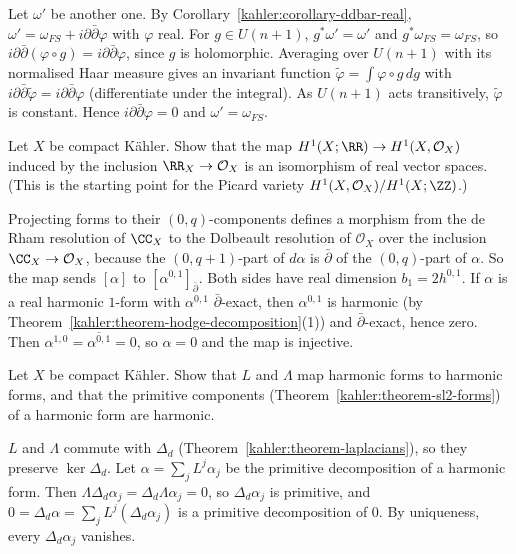 \begin{solution}
Let $\omega'$ be another one. By Corollary~\ref{kahler:corollary-ddbar-real}, $\omega' = \omega_{FS} + i\partial\bar\partial\varphi$
with $\varphi$ real. For $g \in U(n+1)$, $g^*\omega' = \omega'$ and $g^*\omega_{FS} = \omega_{FS}$, so $i\partial\bar\partial(\varphi \circ g) = i\partial\bar\partial\varphi$,
since $g$ is holomorphic. Averaging over $U(n+1)$ with its normalised Haar measure gives an invariant function
$\tilde\varphi = \int\varphi \circ g\,dg$ with $i\partial\bar\partial\tilde\varphi = i\partial\bar\partial\varphi$ (differentiate under the integral). As
$U(n+1)$ acts transitively, $\tilde\varphi$ is constant. Hence $i\partial\bar\partial\varphi = 0$ and $\omega' = \omega_{FS}$.
\end{solution}

\begin{exercise}\label{kahler:exercise-h1-real}
Let $X$ be compact K\"ahler. Show that the map $H^1(X; \RR) \to H^1(X, \mathcal{O}_X)$ induced by the inclusion $\RR_X \to \mathcal{O}_X$ is an
isomorphism of real vector spaces. (This is the starting point for the Picard variety $H^1(X, \mathcal{O}_X)/H^1(X; \ZZ)$.)
\end{exercise}

\begin{solution}
Projecting forms to their $(0,q)$-components defines a morphism from the de Rham resolution of $\CC_X$ to the Dolbeault resolution of
$\mathcal{O}_X$ over the inclusion $\CC_X \to \mathcal{O}_X$, because the $(0, q+1)$-part of $d\alpha$ is $\bar\partial$ of the
$(0,q)$-part of $\alpha$. So the map sends $[\alpha]$ to $[\alpha^{0,1}]_{\bar\partial}$. Both sides have real dimension $b_1 = 2h^{0,1}$.
If $\alpha$ is a real harmonic $1$-form with $\alpha^{0,1}$ $\bar\partial$-exact, then $\alpha^{0,1}$ is harmonic (by
Theorem~\ref{kahler:theorem-hodge-decomposition}(1)) and $\bar\partial$-exact, hence zero. Then $\alpha^{1,0} = \overline{\alpha^{0,1}} = 0$,
so $\alpha = 0$ and the map is injective.
\end{solution}

\begin{exercise}\label{kahler:exercise-lefschetz-harmonic}
Let $X$ be compact K\"ahler. Show that $L$ and $\Lambda$ map harmonic forms to harmonic forms, and that the primitive components
(Theorem~\ref{kahler:theorem-sl2-forms}) of a harmonic form are harmonic.
\end{exercise}

\begin{solution}
$L$ and $\Lambda$ commute with $\Delta_d$ (Theorem~\ref{kahler:theorem-laplacians}), so they preserve $\ker\Delta_d$. Let
$\alpha = \sum_jL^j\alpha_j$ be the primitive decomposition of a harmonic form. Then $\Lambda\Delta_d\alpha_j = \Delta_d\Lambda\alpha_j = 0$,
so $\Delta_d\alpha_j$ is primitive, and $0 = \Delta_d\alpha = \sum_jL^j(\Delta_d\alpha_j)$ is a primitive decomposition of $0$. By
uniqueness, every $\Delta_d\alpha_j$ vanishes.
\end{solution}

